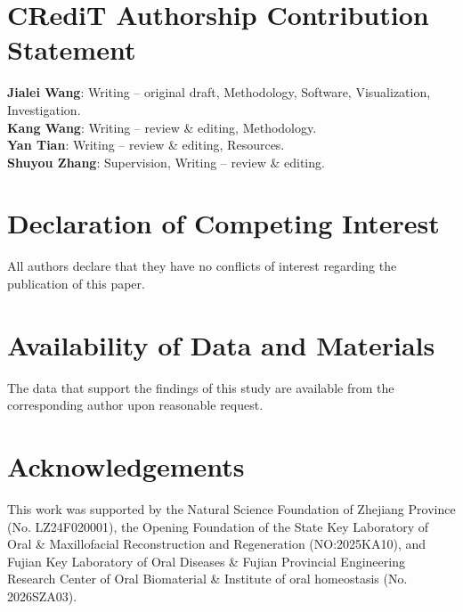 \documentclass[preprint,review,12pt]{elsarticle}
\begin{document}
\section*{CRediT Authorship Contribution Statement}
\textbf{Jialei Wang}: Writing -- original draft, Methodology, Software, Visualization, Investigation.\\
\textbf{Kang Wang}: Writing -- review \& editing, Methodology.\\
\textbf{Yan Tian}: Writing -- review \& editing, Resources.\\
\textbf{Shuyou Zhang}: Supervision, Writing -- review \& editing.

\section*{Declaration of Competing Interest}
All authors declare that they have no conflicts of interest regarding the publication of this paper.

\section*{Availability of Data and Materials}
The data that support the findings of this study are available from the corresponding author upon reasonable request.

\section*{Acknowledgements}
This work was supported by the Natural Science Foundation of Zhejiang Province (No. LZ24F020001), the Opening Foundation of the State Key Laboratory of Oral \& Maxillofacial Reconstruction and Regeneration (NO:2025KA10), and Fujian Key Laboratory of Oral Diseases \& Fujian Provincial Engineering Research Center of Oral Biomaterial \& Institute of oral homeostasis (No. 2026SZA03).


\renewcommand{\bibfont}{\footnotesize}
\setlength{\bibsep}{2pt}
\end{document}
